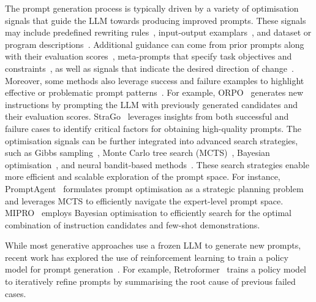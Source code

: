 \documentclass[]{selfevolagent}
\theoremstyle{plain}
\theoremstyle{definition}
\theoremstyle{remark}
\begin{document}
The prompt generation process is typically driven by a variety of optimisation signals that guide the LLM towards producing improved prompts. These signals may include predefined rewriting rules~\citep{xu2022gps, zhou-etal-2024-fairer}, input-output examplars~\citep{zhou2023large,xu2024reprompting}, and dataset or program descriptions~\citep{opsahl2024optimizing}. Additional guidance can come from prior prompts along with their evaluation scores~\citep{yang2024large}, meta-prompts that specify task objectives and constraints~\citep{ye2023prompt,hsieh2024automatic,wang2024promptagent,xiang2025self}, as well as signals that indicate the desired direction of change~\citep{fernando2024promptbreeder,guo2024evoprompt,opsahl2024optimizing}. Moreover, some methods also leverage success and failure examples to highlight effective or problematic prompt patterns~\citep{wu2024strago,yao2024retroformer}. 
For example, ORPO~\citep{yang2024large} generates new instructions by prompting the LLM with previously generated candidates and their evaluation scores. StraGo~\citep{wu2024strago} leverages insights from both successful and failure cases to identify critical factors for obtaining high-quality prompts. The optimisation signals can be further integrated into advanced search strategies, such as Gibbs sampling~\citep{xu2024reprompting}, Monte Carlo tree search (MCTS)~\citep{wang2024promptagent}, Bayesian optimisation~\citep{opsahl2024optimizing,lin2024use,hu2024localized,schneider2025hyperband,wan2025few}, and neural bandit-based methods~\citep{lin2024use,shi2024best,lin2024prompt}. These search strategies enable more efficient and scalable exploration of the prompt space. For instance, PromptAgent~\citep{wang2024promptagent} formulates prompt optimisation as a strategic planning problem and leverages MCTS to efficiently navigate the expert-level prompt space. MIPRO~\citep{opsahl2024optimizing} employs Bayesian optimisation to efficiently search for the optimal combination of instruction candidates and few-shot demonstrations. 

While most generative approaches use a frozen LLM to generate new prompts, recent work has explored the use of reinforcement learning to train a policy model for prompt generation~\citep{deng2022rlprompt,sun2024query,yao2024retroformer,wang2025ragen}. For example, Retroformer~\citep{yao2024retroformer} trains a policy model to iteratively refine prompts by summarising the root cause of previous failed cases. 
\end{document}
